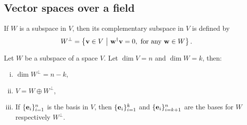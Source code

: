 \subsection{Vector spaces over a field}

%
%

\begin{definition}\label{def:orthsubspace}
	\cite[12.7]{holst} If $W$ is a subspace in $V$, then its complementary subspace in $V$ is defined by 
	\[
	W^\perp = \left\lbrace \mathbf{v} \in V \ \middle\vert \ \mathbf{w}^\dagger \mathbf{v} = 0, \text{ for any } \mathbf{w} \in W \right\rbrace.
	\]
\end{definition}

\begin{lemma}\label{lemma:compsubspace}\cite[Thm 12.16]{holst}
	Let $W$ be a subspace of a space $V$. Let $\dim V = n$ and $\dim W = k$, then:
	\noindent
	\begin{enumerate}[i)]
		\setlength\itemsep{-0.5em}
		\item $\dim W^\perp = n - k$,
		\item $V = W \oplus W^\perp$,
		\item If $\{\mathbf{e}_i\}_{i=1}^{n}$ is the basis in $V$, then $\{\mathbf{e}_i\}_{i=1}^{k}$ and $\{\mathbf{e}_i\}_{i=k+1}^{n}$ are the bases for $W$ respectively $W^\perp$.
	\end{enumerate}
\end{lemma}

